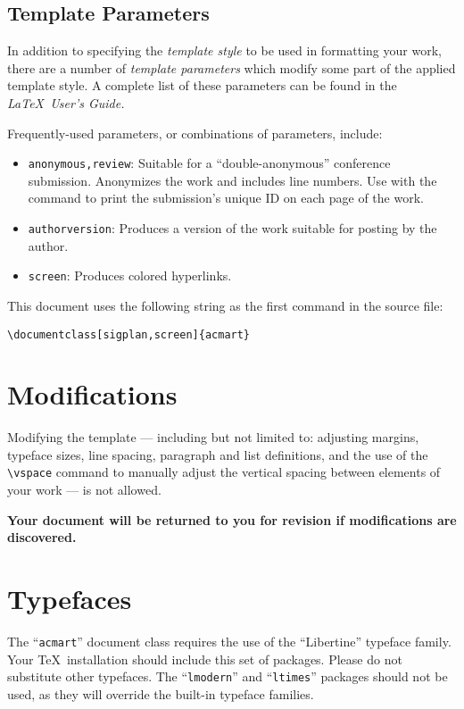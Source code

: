 \documentclass[sigplan,screen]{acmart}
\begin{document}
\subsection{Template Parameters}

In addition to specifying the {\itshape template style} to be used in
formatting your work, there are a number of {\itshape template parameters}
which modify some part of the applied template style. A complete list
of these parameters can be found in the {\itshape \LaTeX\ User's Guide.}

Frequently-used parameters, or combinations of parameters, include:
\begin{itemize}
\item {\texttt{anonymous,review}}: Suitable for a ``double-anonymous''
  conference submission. Anonymizes the work and includes line
  numbers. Use with the \texttt{\string\acmSubmissionID} command to print the
  submission's unique ID on each page of the work.
\item{\texttt{authorversion}}: Produces a version of the work suitable
  for posting by the author.
\item{\texttt{screen}}: Produces colored hyperlinks.
\end{itemize}

This document uses the following string as the first command in the
source file:
\begin{verbatim}
\documentclass[sigplan,screen]{acmart}
\end{verbatim}

\section{Modifications}

Modifying the template --- including but not limited to: adjusting
margins, typeface sizes, line spacing, paragraph and list definitions,
and the use of the \verb|\vspace| command to manually adjust the
vertical spacing between elements of your work --- is not allowed.

{\bfseries Your document will be returned to you for revision if
  modifications are discovered.}

\section{Typefaces}

The ``\verb|acmart|'' document class requires the use of the
``Libertine'' typeface family. Your \TeX\ installation should include
this set of packages. Please do not substitute other typefaces. The
``\verb|lmodern|'' and ``\verb|ltimes|'' packages should not be used,
as they will override the built-in typeface families.
\end{document}
